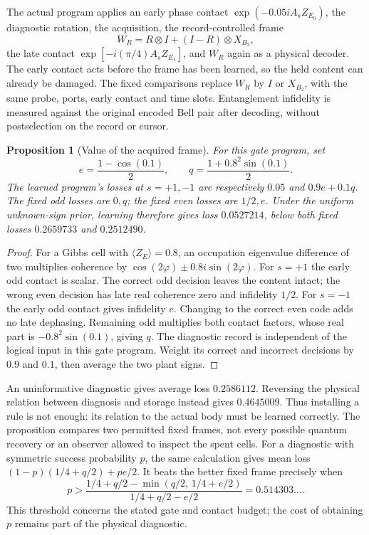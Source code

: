 \documentclass[12pt]{article}
\newtheorem{proposition}[theorem]{Proposition}
\theoremstyle{definition}
\theoremstyle{remark}
\begin{document}
The actual program applies an early phase contact
$\exp(-0.05i A_sZ_{E_0})$, the diagnostic rotation, the acquisition,
the record-controlled frame
\[
 W_R=R\otimes I+(I-R)\otimes X_{B_2},
\]
the late contact $\exp[-i(\pi/4)A_sZ_{E_1}]$, and $W_R$ again
as a physical decoder. The early contact acts before the frame has
been learned, so the held content can already be damaged. The fixed
comparisons replace $W_R$ by $I$ or $X_{B_2}$, with the same probe,
ports, early contact and time slots. Entanglement infidelity is measured
against the original encoded Bell pair after decoding, without
postselection on the record or cursor.

\begin{proposition}[Value of the acquired frame]\label{prop:framevalue}
For this gate program, set
\[
 e=\frac{1-\cos(0.1)}2,\qquad
 q=\frac{1+0.8^2\sin(0.1)}2.
\]
The learned program's losses at $s=+1,-1$ are respectively
$0.05$ and $0.9e+0.1q$. The fixed odd losses are $0,q$;
the fixed even losses are $1/2,e$. Under the uniform unknown-sign
prior, learning therefore gives loss $0.0527214$, below both
fixed losses $0.2659733$ and $0.2512490$.
\end{proposition}
\begin{proof}
For a Gibbs cell with $\langle Z_E\rangle=0.8$, an occupation
eigenvalue difference of two multiplies coherence by
$\cos(2\varphi)\pm0.8i\sin(2\varphi)$.
For $s=+1$ the early odd contact is scalar. The correct odd decision
leaves the content intact; the wrong even decision has late real
coherence zero and infidelity $1/2$.
For $s=-1$ the early odd contact gives infidelity $e$.
Changing to the correct even code adds no late dephasing. Remaining
odd multiplies both contact factors, whose real part is
$-0.8^2\sin(0.1)$, giving $q$. The diagnostic record is independent
of the logical input in this gate program. Weight its correct and
incorrect decisions by $0.9$ and $0.1$, then average the two plant
signs.
\end{proof}

An uninformative diagnostic gives average loss $0.2586112$.
Reversing the physical relation between diagnosis and storage instead
gives $0.4645009$. Thus installing a rule is not enough: its relation
to the actual body must be learned correctly. The proposition compares
two permitted fixed frames, not every possible quantum recovery or
an observer allowed to inspect the spent cells.
For a diagnostic with symmetric success probability $p$, the same
calculation gives mean loss
$(1-p)(1/4+q/2)+pe/2$. It beats the better fixed frame precisely when
\[
 p>\frac{1/4+q/2-\min(q/2,\,1/4+e/2)}{1/4+q/2-e/2}
   =0.514303\ldots .
\]
This threshold concerns the stated gate and contact budget; the
cost of obtaining $p$ remains part of the physical diagnostic.
\end{document}
